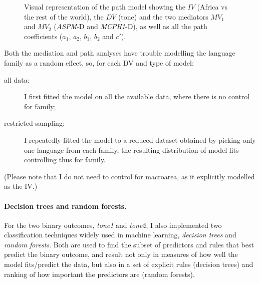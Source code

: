 \documentclass[twoside,twocolumn]{article}
\begin{document}
\begin{figure}[h]
  \centering


  \caption{Visual representation of the path model showing the $IV$ (Africa vs the rest of the world), the $DV$ (tone) and the two mediators $MV_1$ and $MV_2$ (\textit{ASPM}-D and \textit{MCPH1}-D), as well as all the path coefficients ($a_1$, $a_2$, $b_1$, $b_2$ and $c'$). }
  \label{Fig:path_analysis}
\end{figure}

Both the mediation and path analyses have trouble modelling the language family as a random effect, so, for each DV and type of model:

\begin{description}
  \item[all data:] I first fitted the model on all the available data, where there is no control for family;
  \item[restricted sampling:] I repeatedly fitted the model to a reduced dataset obtained by picking only one language from each family, the resulting distribution of model fits controlling thus for family.
\end{description}

(Please note that I do not need to control for macroarea, as it explicitly modelled as the IV.)


\paragraph{Decision trees and random forests.}

For the two binary outcomes, \textit{tone1} and \textit{tone2}, I also implemented two classification techniques widely used in machine learning, \emph{decision trees} and \emph{random forests}.
Both are used to find the subset of predictors and rules that best predict the binary outcome, and result not only in measures of how well the model fits/predict the data, but also in a set of explicit rules (decision trees) and ranking of how important the predictors are (random forests).
\end{document}
